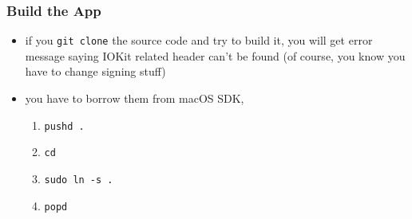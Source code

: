 \documentclass{beamer}
\begin{document}
\begin{frame}
  \frametitle{Build the App}
  \begin{itemize}
  \item if you \texttt{git clone} the source code and try to build it, you will get error message saying IOKit related header can't be found (of course, you know you have to change signing stuff)
  \item you have to borrow them from macOS SDK,
    \begin{enumerate}
    \item \texttt{pushd .}
    \item \texttt{cd }
    \item \texttt{sudo ln -s  .}
    \item \texttt{popd}
    \end{enumerate}
  \end{itemize}
\end{frame}
\end{document}
